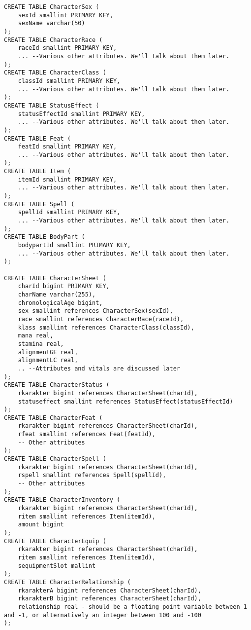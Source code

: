 \documentclass[openany,11pt,a4paper]{book}
\begin{document}
\begin{lstlisting}[style=SqlStyle]
CREATE TABLE CharacterSex (
	sexId smallint PRIMARY KEY,
	sexName varchar(50)
);
CREATE TABLE CharacterRace (
	raceId smallint PRIMARY KEY,
	... --Various other attributes. We'll talk about them later.
);
CREATE TABLE CharacterClass (
	classId smallint PRIMARY KEY,
	... --Various other attributes. We'll talk about them later.
);
CREATE TABLE StatusEffect (
	statusEffectId smallint PRIMARY KEY,
	... --Various other attributes. We'll talk about them later.
);
CREATE TABLE Feat (
	featId smallint PRIMARY KEY,
	... --Various other attributes. We'll talk about them later.
);
CREATE TABLE Item (
	itemId smallint PRIMARY KEY,
	... --Various other attributes. We'll talk about them later.
);
CREATE TABLE Spell (
	spellId smallint PRIMARY KEY,
	... --Various other attributes. We'll talk about them later.
);
CREATE TABLE BodyPart (
	bodypartId smallint PRIMARY KEY,
	... --Various other attributes. We'll talk about them later.
);

CREATE TABLE CharacterSheet (
	charId bigint PRIMARY KEY,
	charName varchar(255),
	chronologicalAge bigint,
	sex smallint references CharacterSex(sexId),
	race smallint references CharacterRace(raceId),
	klass smallint references CharacterClass(classId),
	mana real,
	stamina real,
	alignmentGE real,
	alignmentLC real,
	.. --Attributes and vitals are discussed later
);
CREATE TABLE CharacterStatus (
	rkarakter bigint references CharacterSheet(charId),
	statuseffect smallint references StatusEffect(statusEffectId)
);
CREATE TABLE CharacterFeat (
	rkarakter bigint references CharacterSheet(charId),
	rfeat smallint references Feat(featId),
	-- Other attributes
);
CREATE TABLE CharacterSpell (
	rkarakter bigint references CharacterSheet(charId),
	rspell smallint references Spell(spellId),
	-- Other attributes
);
CREATE TABLE CharacterInventory (
	rkarakter bigint references CharacterSheet(charId),
	ritem smallint references Item(itemId),
	amount bigint
);
CREATE TABLE CharacterEquip (
	rkarakter bigint references CharacterSheet(charId),
	ritem smallint references Item(itemId),
	sequipmentSlot mallint
);
CREATE TABLE CharacterRelationship (
	rkarakterA bigint references CharacterSheet(charId),
	rkarakterB bigint references CharacterSheet(charId),
	relationship real - should be a floating point variable between 1 and -1, or alternatively an integer between 100 and -100
);
\end{lstlisting}
\end{document}

